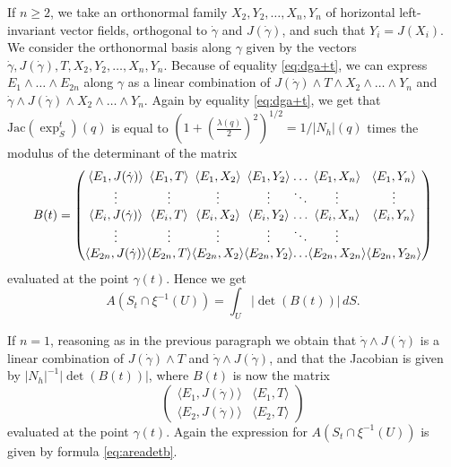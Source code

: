 \documentclass[10pt]{amsart}
\theoremstyle{definition}
\theoremstyle{remark}
\numberwithin{equation}{section}
\begin{document}
If $n{\geqslant} 2$, we take an orthonormal family $X_2,Y_2,\ldots,X_n,Y_n$ of horizontal left-invariant vector fields, orthogonal to ${\dot{\gamma}}$ and $J({\dot{\gamma}})$, and such that $Y_i=J(X_i)$. We consider the orthonormal basis along ${\gamma}$ given by the vectors ${\dot{\gamma}},J({\dot{\gamma}}),T,X_2,Y_2,\ldots,X_n,Y_n$. Because of equality \eqref{eq:dga+t}, we can express $E_1\wedge\ldots\wedge E_{2n}$ along ${\gamma}$ as a linear combination of  $J({\dot{\gamma}})\wedge T\wedge X_2\wedge\ldots\wedge Y_n$ and ${\dot{\gamma}}\wedge J({\dot{\gamma}})\wedge X_2\wedge\ldots\wedge Y_n$. Again by equality \eqref{eq:dga+t}, we get that $\text{Jac}(\exp_S^t)(q)$ is equal to $(1+(\tfrac{{\lambda}(q)}{2})^2)^{1/2}=1/|N_h|(q)$ times the modulus of the determinant of the matrix 
\begin{equation}
\label{eq:matrix}
B(t)={\setlength{\arraycolsep}{0pt}\begin{pmatrix}
{\langle{E_1,J({\dot{\gamma}})}\rangle} & {\langle{E_1,T}\rangle} & {\langle{E_1,X_2}\rangle}  & {\langle{E_1,Y_2}\rangle} &\ldots  & {\langle{E_1,X_n}\rangle} & {\langle{E_1,Y_n}\rangle}
\\
\vdots & \vdots & \vdots& \vdots & \ddots & \vdots & \vdots &
\\
{\langle{E_i,J({\dot{\gamma}})}\rangle} & {\langle{E_i,T}\rangle} & {\langle{E_i,X_2}\rangle}  & {\langle{E_i,Y_2}\rangle} & \ldots  & {\langle{E_i,X_n}\rangle} & {\langle{E_i,Y_n}\rangle}
\\
\vdots & \vdots &  \vdots & \vdots & \ddots & \vdots 
\\
{\langle{E_{2n},J({\dot{\gamma}})}\rangle} & {\langle{E_{2n},T}\rangle} & {\langle{E_{2n},X_2}\rangle}  & {\langle{E_{2n},Y_2}\rangle} & \ldots  & {\langle{E_{2n},X_{2n}}\rangle} & {\langle{E_{2n},Y_{2n}}\rangle}
\end{pmatrix}}
\end{equation}
evaluated at the point ${\gamma}(t)$. Hence we get
\begin{equation}
\label{eq:areadetb}
A(S_t\cap\xi^{-1}(U))=\int_U |\det(B(t))|\,dS.
\end{equation}

If $n=1$, reasoning as in the previous paragraph we obtain that ${\dot{\gamma}}\wedge J({\dot{\gamma}})$ is a linear combination of $J({\dot{\gamma}})\wedge T$ and ${\dot{\gamma}}\wedge J({\dot{\gamma}})$, and that the Jacobian is given by $|N_h|^{-1} |\det(B(t))|$, where $B(t)$ is now the matrix
\begin{equation}
\label{eq:matrix1}
\begin{pmatrix}
{\langle{E_1,J({\dot{\gamma}})}\rangle} & {\langle{E_1,T}\rangle}
\\
{\langle{E_2,J({\dot{\gamma}})}\rangle} & {\langle{E_2,T}\rangle}
\end{pmatrix}
\end{equation}
evaluated at the point ${\gamma}(t)$. Again the expression for $A(S_t\cap\xi^{-1}(U))$ is given by formula \eqref{eq:areadetb}.
\end{document}
